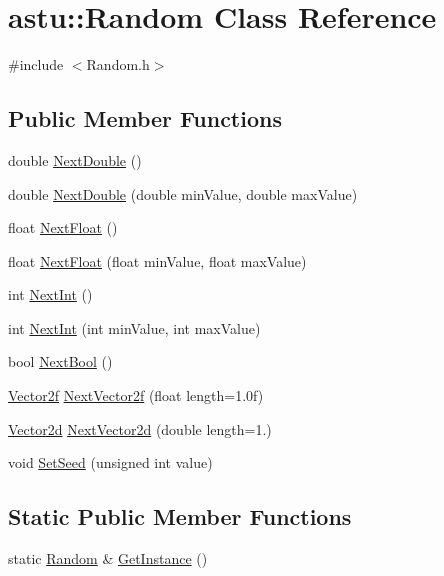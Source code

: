 \hypertarget{classastu_1_1Random}{}\section{astu\+:\+:Random Class Reference}
\label{classastu_1_1Random}


{\ttfamily \#include $<$Random.\+h$>$}

\subsection*{Public Member Functions}
\begin{DoxyCompactItemize}
\item 
double \hyperlink{classastu_1_1Random_afd6e22a3a407fc9db132178a0bd66179}{Next\+Double} ()
\item 
double \hyperlink{classastu_1_1Random_a5413d4f6db045cb272bee7f419847c6f}{Next\+Double} (double min\+Value, double max\+Value)
\item 
float \hyperlink{classastu_1_1Random_aac568f26a878a1dc7facc767c0977713}{Next\+Float} ()
\item 
float \hyperlink{classastu_1_1Random_aedc793a4f422aed4ac49c8e3cde9d3b9}{Next\+Float} (float min\+Value, float max\+Value)
\item 
int \hyperlink{classastu_1_1Random_ae45b2a5f53c1ecc833a6144af345d2fb}{Next\+Int} ()
\item 
int \hyperlink{classastu_1_1Random_a92a532121f8edfb954b548c3c74a6a9c}{Next\+Int} (int min\+Value, int max\+Value)
\item 
bool \hyperlink{classastu_1_1Random_a897ae008b0ecaa39ae970f794431b3ac}{Next\+Bool} ()
\item 
\hyperlink{classastu_1_1Vector2}{Vector2f} \hyperlink{classastu_1_1Random_a52486fe2236c1e052bdafdd5072c5cab}{Next\+Vector2f} (float length=1.\+0f)
\item 
\hyperlink{classastu_1_1Vector2}{Vector2d} \hyperlink{classastu_1_1Random_a4a01ced84c1d07d593adbdbfbdf65f3a}{Next\+Vector2d} (double length=1.)
\item 
void \hyperlink{classastu_1_1Random_a2bbce78e953c8c272d947cda155302c2}{Set\+Seed} (unsigned int value)
\end{DoxyCompactItemize}
\subsection*{Static Public Member Functions}
\begin{DoxyCompactItemize}
\item 
static \hyperlink{classastu_1_1Random}{Random} \& \hyperlink{classastu_1_1Random_ab11313efe9636e69c15df5dd1cf90124}{Get\+Instance} ()
\end{DoxyCompactItemize}


